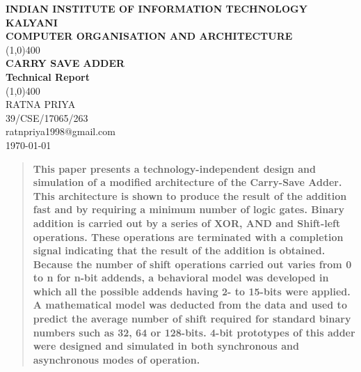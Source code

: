 \documentclass[12pt]{article}
\begin{document}
\begin{titlepage}
\begin{center}
\vspace{1cm}
\Large{\textbf{INDIAN INSTITUTE OF INFORMATION TECHNOLOGY KALYANI}}\\
\huge{\textbf{COMPUTER ORGANISATION AND ARCHITECTURE}}\\

\vfill
\line(1,0){400}\\[1mm]
\huge{\textbf{CARRY SAVE ADDER}}\\[3mm]
\Large{\textbf{Technical Report}}\\[1mm]
\line(1,0){400}\\
\vfill
RATNA PRIYA\\
39/CSE/17065/263\\
ratnpriya1998@gmail.com\\
\today\\
\end{center}
\end{titlepage}

\begin{abstract}
\textbf{This paper presents a technology-independent design and simulation of a modified architecture of 
the Carry-Save Adder. This architecture is shown to produce the result of the addition fast and by 
requiring a  minimum  number  of  logic gates.  Binary addition  is  carried out  by  a  series  of  XOR, 
AND  and  Shift-left  operations.  These  operations  are  terminated  with  a  completion  signal 
indicating  that  the  result  of  the  addition  is  obtained.  Because  the  number  of  shift  operations 
carried out varies from 0  to  n  for n-bit addends, a  behavioral model  was developed in which all 
the  possible  addends  having  2-  to  15-bits  were  applied. A  mathematical model  was deducted 
from  the  data  and  used  to  predict  the  average  number  of  shift  required  for  standard  binary 
numbers such as 32, 64 or 128-bits. 4-bit prototypes of this adder were designed and simulated 
in both synchronous and asynchronous modes of operation.}\cite{abstract} 
\end{abstract}
\end{document}
